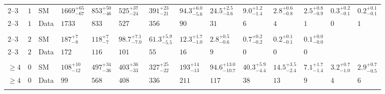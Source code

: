 \begin{landscape}
\begin{center}
\begin{table}[h!]
\begin{tabular}{ llllllllllllll }
    2--3                 & $1$      & SM   & $1669^{+65}_{-67}$             & $853^{+50}_{-46}$              & $525^{+37}_{-24}$              & $391^{+23}_{-21}$              & $94.3^{+6.0}_{-5.6}$           & $24.5^{+2.5}_{-3.6}$           & $9.0^{+1.2}_{-1.4}$            & $2.8^{+0.6}_{-0.8}$            & $2.5^{+0.8}_{-0.9}$            & $0.3^{+0.2}_{-0.1}$            & $0.2^{+0.1}_{-0.1}$ \\ 
    2--3                 & $1$      & Data & $1733$                         & $833$                          & $527$                          & $356$                          & $90$                           & $31$                           & $6$                            & $4$                            & $1$                            & $0$                            & $1$               \\\\
    2--3                 & $2$      & SM   & $187^{+7}_{-8}$                & $118^{+7}_{-7}$                & $98.7^{+7.1}_{-7.0}$           & $61.3^{+5.9}_{-5.5}$           & $12.3^{+1.7}_{-1.0}$           & $2.8^{+0.5}_{-0.6}$            & $0.7^{+0.2}_{-0.2}$            & $0.2^{+0.1}_{-0.1}$            & $0.1^{+0.0}_{-0.0}$                      \\ 
    2--3                 & $2$      & Data & $172$                          & $116$                          & $101$                          & $55$                           & $16$                           & $9$                            & $0$                            & $0$                            & $0$                      \\ \\
    $\geq 4$             & $0$      & SM   & $108^{+10}_{-12}$              & $497^{+34}_{-36}$              & $403^{+36}_{-33}$              & $327^{+25}_{-22}$              & $193^{+14}_{-13}$              & $94.6^{+13.0}_{-10.7}$         & $40.3^{+5.9}_{-4.4}$           & $14.5^{+3.5}_{-2.4}$           & $7.1^{+1.7}_{-1.4}$            & $3.2^{+0.7}_{-1.0}$            & $2.9^{+0.7}_{-0.5}$ \\ 
    $\geq 4$             & $0$      & Data & $99$                           & $568$                          & $408$                          & $336$                          & $211$                          & $117$                          & $38$                           & $13$                           & $9$                            & $4$                            & $6$                 \\\\

\end{tabular}
\end{table}
\end{center}
\end{landscape}
